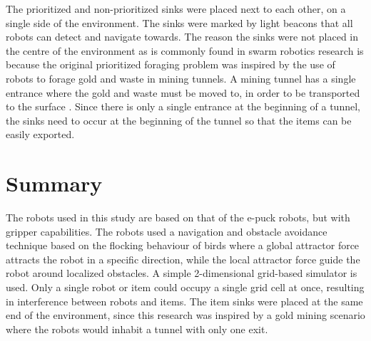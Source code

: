 The prioritized and non-prioritized sinks were placed next to each other, on a single side of the environment. The sinks were marked by light beacons that all robots can detect and navigate towards. The reason the sinks were not placed in the centre of the environment as is commonly found in swarm robotics research \cite{labella2006division} is because the original prioritized foraging problem was inspired by the use of robots to forage gold and waste in mining tunnels. A mining tunnel has a single entrance where the gold and waste must be moved to, in order to be transported to the surface \cite{brune2010extracting}. Since there is only a single entrance at the beginning of a tunnel, the sinks need to occur at the beginning of the tunnel so that the items can be easily exported.


\section{Summary}
\label{robots:summary}
The robots used in this study are based on that of the e-puck robots, but with gripper capabilities. The robots used a navigation and obstacle avoidance technique based on the flocking behaviour of birds where a global attractor force attracts the robot in a specific direction, while the local attractor force guide the robot around localized obstacles. A simple 2-dimensional grid-based simulator is used. Only a single robot or item could occupy a single grid cell at once, resulting in interference between robots and items. The item sinks were placed at the same end of the environment, since this research was inspired by a gold mining scenario where the robots would inhabit a tunnel with only one exit.

